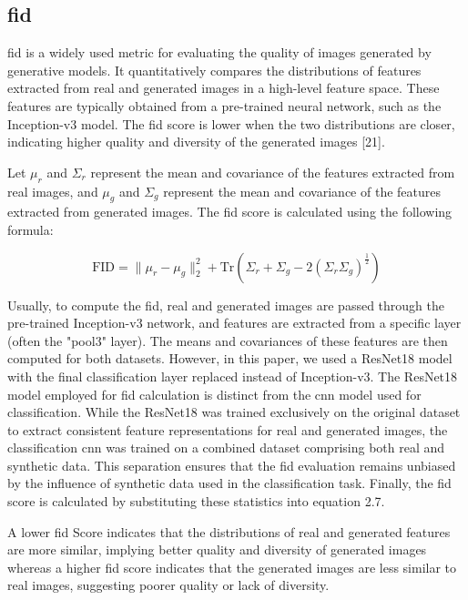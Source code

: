 \subsection{\gls{fid}}
\gls{fid} is a widely used metric for evaluating the quality of images generated by generative models. It quantitatively compares the distributions of features extracted from real and generated images in a high-level feature space. These features are typically obtained from a pre-trained neural network, such as the Inception-v3 model. The \gls{fid} score is lower when the two distributions are closer, indicating higher quality and diversity of the generated images [21].

Let $\mu_r$ and $\Sigma_r$ represent the mean and covariance of the features extracted from real images, and $\mu_g$ and $\Sigma_g$ represent the mean and covariance of the features extracted from generated images. The \gls{fid} score is calculated using the following formula:

\begin{equation}
\text{FID} = \|\mu_r - \mu_g\|_2^2 + \text{Tr}(\Sigma_r + \Sigma_g - 2 (\Sigma_r \Sigma_g)^{\frac{1}{2}})
\end{equation}

Usually, to compute the \gls{fid}, real and generated images are passed through the pre-trained Inception-v3 network, and features are extracted from a specific layer (often the "pool3" layer). The means and covariances of these features are then computed for both datasets. However, in this paper, we used a ResNet18 model with the final classification layer replaced instead of Inception-v3.  The ResNet18 model employed for \gls{fid} calculation is distinct from the \gls{cnn} model used for classification. While the ResNet18 was trained exclusively on the original dataset to extract consistent feature representations for real and generated images, the classification \gls{cnn} was trained on a combined dataset comprising both real and synthetic data. This separation ensures that the \gls{fid} evaluation remains unbiased by the influence of synthetic data used in the classification task. Finally, the \gls{fid} score is calculated by substituting these statistics into equation 2.7. 

A lower \gls{fid} Score indicates that the distributions of real and generated features are more similar, implying better quality and diversity of generated images whereas a higher \gls{fid} score indicates that the generated images are less similar to real images, suggesting poorer quality or lack of diversity.

